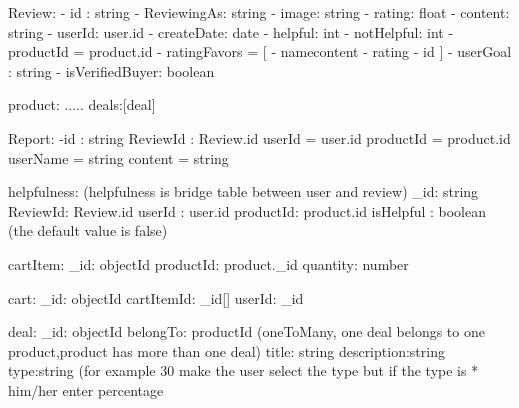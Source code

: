 Review:
    - id : string
    - ReviewingAs: string
    - image: string
    - rating: float
    - content: string
    - userId: user.id
    - createDate: date
    - helpful: int
    - notHelpful: int
    - productId = product.id 
    - ratingFavors = [{
        - namecontent
        - rating
        - id
    }]
    - userGoal : string
    - isVerifiedBuyer: boolean

product:
    .....
    deals:[deal]

Report:
    -id : string
    ReviewId : Review.id
    userId = user.id
    productId = product.id
    userName = string
    content = string

helpfulness: (helpfulness is bridge table between user and review)
    _id: string
    ReviewId: Review.id
    userId : user.id
    productId: product.id
    isHelpful : boolean (the default value is false)

cartItem:
    _id: objectId
    productId: product._id
    quantity: number

cart: 
    _id: objectId
    cartItemId: _id[]
    userId: _id

deal:
    _id: objectId
    belongTo: productId (oneToMany, one deal belongs to one
                        product,product has more than one deal)
    title: string
    description:string
    type:string (for example 30%
        make the user select the type but if the type is *%
        him/her enter percentage

